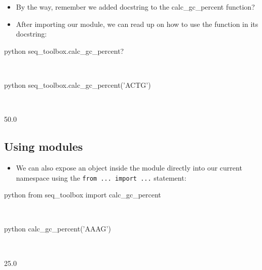 \documentclass[aspectratio=1610,slidestop]{beamer}
\begin{document}
\begin{pframe}
 \begin{itemize}
  \item By the way, remember we added docstring to the calc\_gc\_percent
  function?
  \item After importing our module, we can read up on how to use the function
  in its docstring:
 \end{itemize}

 \begin{ipython}
   \begin{pythonin}{python}
seq_toolbox.calc_gc_percent?
   \end{pythonin}
   \\
   \begin{pythonin}{python}
seq_toolbox.calc_gc_percent('ACTG')
   \end{pythonin}
   \\
   \begin{pythonout}
50.0
   \end{pythonout}
 \end{ipython}
\end{pframe}

\subsection{Using modules}
\begin{pframe}
 \begin{itemize}
  \item We can also expose an object inside the module directly into our
  current namespace using the \texttt{from ... import ...}
  statement:
 \end{itemize}
 \begin{ipython}
   \begin{pythonin}{python}
from seq_toolbox import calc_gc_percent
   \end{pythonin}
   \\
   \begin{pythonin}{python}
calc_gc_percent('AAAG')
   \end{pythonin}
   \\
   \begin{pythonout}
25.0
   \end{pythonout}
 \end{ipython}
\end{pframe}
\end{document}
